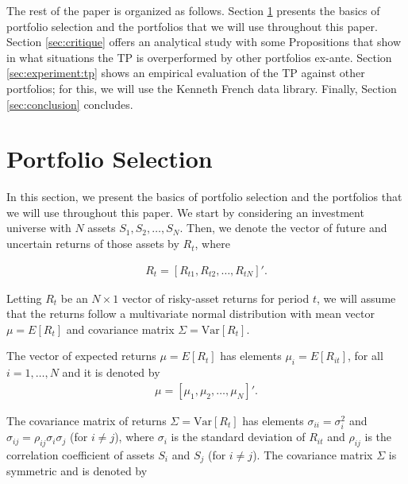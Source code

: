 \documentclass[12pt,oneside,a4paper]{memoir}
\begin{document}
The rest of the paper is organized as follows.
Section \ref{sec:ports} presents the basics of portfolio selection and the portfolios that we will use throughout this paper.
Section \ref{sec:critique} offers an analytical study with some Propositions that show in what situations the TP is overperformed by other portfolios ex-ante.
Section \ref{sec:experiment:tp} shows an empirical evaluation of the TP against other portfolios; for this, we will use the Kenneth French data library.
Finally, Section \ref{sec:conclusion} concludes.


\section{Portfolio Selection} \label{sec:ports}

In this section, we present the basics of portfolio selection and the portfolios that we will use throughout this paper. We start by considering an investment universe with $N$ assets $S_1, S_2, \dots, S_N$. Then, we denote the vector of future and uncertain returns of those assets by $R_{t}$, where 

\vspace{-12pt}
\begin{align*} \label{ret_vec}
	R_{t} =  [R_{t1}, R_{t2} , \dots, R_{tN}]'.
\end{align*}

\noindent
Letting $R_t$ be an $N \times 1$ vector of risky-asset returns for period $t$, we will assume that the returns follow a multivariate normal distribution with mean vector $\mu=E[R_{t}]$ and covariance matrix $\Sigma = \mathrm{Var}[R_{t}]$.

The vector of expected returns $\mu = E[{R_{t}}]$ has elements $\mu_i = E[R_{it}]$, for all $i=1, \dots, N$ and it is denoted by 
\begin{align*}
	\mu = [\mu_1, \mu_2, \dots, \mu_N]'.
\end{align*}

The covariance matrix of returns $\Sigma = \mathrm{Var}[R_{t}]$ has elements
$\sigma_{ii} = \sigma_i^2$ and $\sigma_{ij} = \rho_{ij} \sigma_i \sigma_j$ (for $i \neq j$), where  $\sigma_i$ is the standard deviation of $R_{it}$ and $\rho_{ij}$ is the correlation coefficient of assets $S_i$ and $S_j$ (for $i \neq j$).
The covariance matrix $\Sigma$ is symmetric and is denoted by
\end{document}
